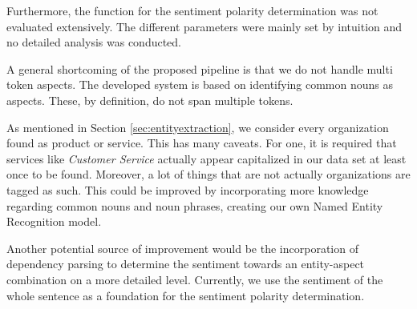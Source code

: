 \documentclass[10pt,a4paper]{article}
\begin{document}
	Furthermore, the function for the sentiment polarity determination was not evaluated extensively. The different parameters were mainly set by intuition and no detailed analysis was conducted.

	A general shortcoming of the proposed pipeline is that we do not handle multi token aspects. The developed system is based on identifying common nouns as aspects. These, by definition, do not span multiple tokens.

	As mentioned in Section \ref{sec:entityextraction}, we consider every organization found as product or service. This has many caveats. For one, it is required that services like \textit{Customer Service} actually appear capitalized in our data set at least once to be found. Moreover, a lot of things that are not actually organizations are tagged as such. This could be improved by incorporating more knowledge regarding common nouns and noun phrases, creating our own Named Entity Recognition model.
	
	Another potential source of improvement would be the incorporation of dependency parsing to determine the sentiment towards an entity-aspect combination on a more detailed level. Currently, we use the sentiment of the whole sentence as a foundation for the sentiment polarity determination.

	\newpage

	\nocite{Liu12sentimentanalysis}
	
	
\end{document}
